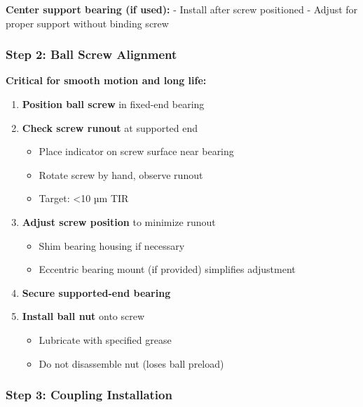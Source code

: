 \documentclass[
]{article}
\providecommand{\tightlist}{%
  \setlength{\itemsep}{0pt}\setlength{\parskip}{0pt}}
\begin{document}
\textbf{Center support bearing (if used):} - Install after screw
positioned - Adjust for proper support without binding screw

\subsubsection{Step 2: Ball Screw
Alignment}\label{step-2-ball-screw-alignment}

\textbf{Critical for smooth motion and long life:}

\begin{enumerate}
\def\labelenumi{\arabic{enumi}.}
\tightlist
\item
  \textbf{Position ball screw} in fixed-end bearing
\item
  \textbf{Check screw runout} at supported end

  \begin{itemize}
  \tightlist
  \item
    Place indicator on screw surface near bearing
  \item
    Rotate screw by hand, observe runout
  \item
    Target: \textless10 µm TIR
  \end{itemize}
\item
  \textbf{Adjust screw position} to minimize runout

  \begin{itemize}
  \tightlist
  \item
    Shim bearing housing if necessary
  \item
    Eccentric bearing mount (if provided) simplifies adjustment
  \end{itemize}
\item
  \textbf{Secure supported-end bearing}
\item
  \textbf{Install ball nut} onto screw

  \begin{itemize}
  \tightlist
  \item
    Lubricate with specified grease
  \item
    Do not disassemble nut (loses ball preload)
  \end{itemize}
\end{enumerate}

\subsubsection{Step 3: Coupling
Installation}\label{step-3-coupling-installation}
\end{document}
